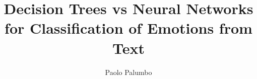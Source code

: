 \documentclass[10pt]{article}
\author{Paolo Palumbo}
\title{Decision Trees vs Neural Networks for Classification of Emotions from Text}
\begin{document}
\maketitle
\begin{multicols}{2}




\end{multicols}



\end{document}
